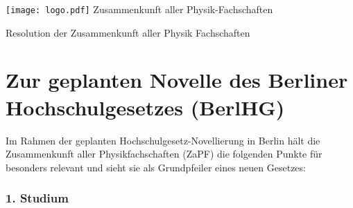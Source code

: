 \documentclass[DIV=calc]{scrartcl}
\begin{document}
\hspace{0.87\textwidth}
\begin{minipage}{120pt}
\vspace{-1.8cm}
\texttt{[image: logo.pdf]}
\centering
\small Zusammenkunft aller Physik-Fachschaften
\end{minipage}

\begin{center}
\huge{Resolution der Zusammenkunft aller Physik Fachschaften}\vspace{.25\baselineskip}\\
\normalsize
\end{center}
\vspace{1cm}


\section*{Zur geplanten Novelle des Berliner Hochschulgesetzes (BerlHG)}
Im Rahmen der geplanten Hochschulgesetz-Novellierung in Berlin hält die
Zusammenkunft aller Physikfachschaften (ZaPF) die folgenden Punkte für
besonders relevant und sieht sie als %
Grundpfeiler eines neuen Gesetzes:


\hypertarget{studium}{%
\subsubsection*{1. Studium}\label{studium}}
\end{document}
